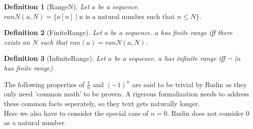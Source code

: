 \documentclass{article}
\newenvironment{forthel}{\begin{leftbar}}{\end{leftbar}}
\newtheorem{definition}{Definition}
\begin{document}
\begin{forthel}
	\begin{definition}[RangeN] Let $a$ be a sequence. \\ $ranN(a,N) = \{a[n] \mid \text{n is a natural number such that } n \leq N\}$. 
	\end{definition}
	
	\begin{definition}[FiniteRange]	Let $a$ be a sequence. $a$ has finite range iff there exists an $N$ such that $ran(a) = ranN(a,N)$.
	\end{definition}

	\begin{definition}[InfiniteRange] Let $a$ be a sequence. $a$ has infinite range iff $\neg$ ($a$ has finite range).
	\end{definition}
\end{forthel}

\noindent The following properties of $\frac{1}{n}$ and $(-1)^{n}$ are said to be trivial by Rudin as they only need 'common math' to be proven. A rigerous formalization needs to address these common facts seperately, so they text gets naturally longer.\\

\noindent Here we also have to consider the special case of $n=0$. Rudin does not consider 0 as a natural number.
\end{document}
